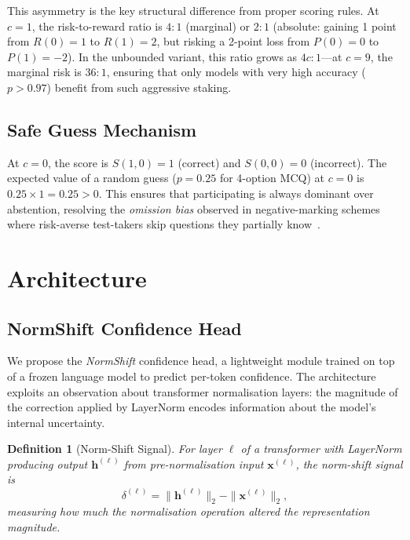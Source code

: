 \documentclass[11pt,a4paper]{article}
\newtheorem{definition}{Definition}
\begin{document}
This asymmetry is the key structural difference from proper scoring
rules.  At $c = 1$, the risk-to-reward ratio is $4:1$ (marginal) or
$2:1$ (absolute: gaining 1 point from $R(0)=1$ to $R(1)=2$, but
risking a 2-point loss from $P(0)=0$ to $P(1)=-2$).  In the unbounded
variant, this ratio grows as $4c:1$---at $c = 9$, the marginal risk is
$36:1$, ensuring that only models with very high accuracy ($p > 0.97$)
benefit from such aggressive staking.

\subsection{Safe Guess Mechanism}

At $c = 0$, the score is $S(1,0) = 1$ (correct) and $S(0,0) = 0$
(incorrect).  The expected value of a random guess ($p = 0.25$ for
4-option MCQ) at $c = 0$ is $0.25 \times 1 = 0.25 > 0$.  This ensures
that participating is always dominant over abstention, resolving the
\emph{omission bias} observed in negative-marking schemes where
risk-averse test-takers skip questions they partially
know~\cite{budescu2012optimal}.


\section{Architecture}
\label{sec:architecture}

\subsection{NormShift Confidence Head}

We propose the \emph{NormShift} confidence head, a lightweight module
trained on top of a frozen language model to predict per-token
confidence.  The architecture exploits an observation about transformer
normalisation layers: the magnitude of the correction applied by
LayerNorm encodes information about the model's internal uncertainty.

\begin{definition}[Norm-Shift Signal]
  For layer $\ell$ of a transformer with LayerNorm producing output
  $\mathbf{h}^{(\ell)}$ from pre-normalisation input
  $\mathbf{x}^{(\ell)}$, the norm-shift signal is
  \begin{equation}
    \delta^{(\ell)} = \|\mathbf{h}^{(\ell)}\|_{2} - \|\mathbf{x}^{(\ell)}\|_{2},
  \end{equation}
  measuring how much the normalisation operation altered the
  representation magnitude.
\end{definition}
\end{document}

